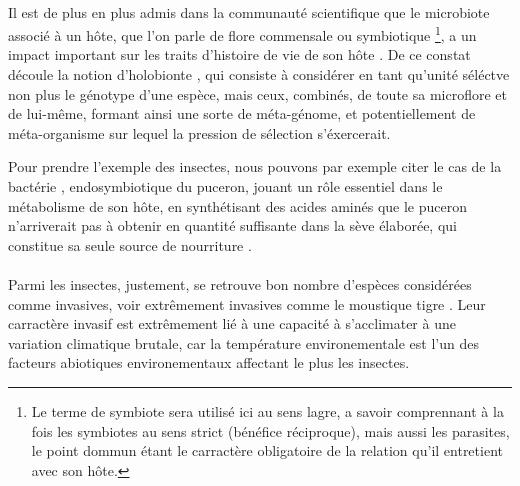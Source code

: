 

\paragraph{} %
\label{par:intro1}

Il est de plus en plus admis dans la communauté scientifique que le microbiote
associé à un hôte, que l'on parle de flore commensale ou symbiotique
\footnote{Le terme de symbiote sera utilisé ici au sens lagre, a savoir
comprennant à la fois les symbiotes au sens strict (bénéfice réciproque), mais
aussi les parasites, le point dommun étant le carractère obligatoire de la
relation qu'il entretient avec son hôte.}, a un impact important sur les
traits d'histoire de vie de son hôte \cite{feldhaar2011}. De ce constat
découle la notion d'holobionte \cite{rosenberg2007}, qui consiste à considérer
en tant qu'unité séléctve non plus le génotype d'une espèce, mais ceux,
combinés, de toute sa microflore et de lui-même, formant ainsi une sorte de
méta-génome, et potentiellement de méta-organisme sur lequel la pression de
sélection s'éxercerait.

Pour prendre l'exemple des insectes, nous pouvons par exemple citer le cas de
la bactérie ,  endosymbiotique du puceron, jouant un rôle
essentiel dans le métabolisme de son hôte,  en synthétisant des acides aminés
que le puceron n'arriverait pas à obtenir en quantité suffisante dans la sève
élaborée, qui constitue sa seule source de nourriture \cite{douglas1998}.



\paragraph{} %
\label{par:intro2}

Parmi les insectes, justement, se retrouve bon nombre d'espèces considérées
comme invasives, voir extrêmement invasives comme le moustique tigre
. Leur carractère invasif est extrêmement lié à une
capacité à s'acclimater à une variation climatique brutale, car la température
environementale est l'un des facteurs abiotiques environementaux affectant le
plus les insectes.

